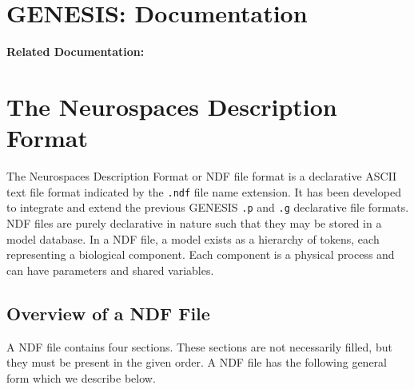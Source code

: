 \documentclass[12pt]{article}
\begin{document}
\section*{GENESIS: Documentation}

{\bf Related Documentation:}

\section*{The Neurospaces Description Format}

The Neurospaces Description Format or NDF file format is a declarative ASCII text file format indicated by the {\tt .ndf} file name extension. It has been developed to integrate and extend the previous GENESIS {\tt .p} and {\tt .g} declarative file formats. NDF files are purely declarative in nature such that they may be stored in a model database. In a NDF file, a model exists as a hierarchy of tokens, each representing a biological component. Each component is a physical process and can have parameters and shared variables. 

\subsection*{Overview of a NDF File}
\label{sec:overview-ndf-file}
A NDF file contains four sections. These sections are not necessarily
filled, but they must be present in the given order.  A NDF file has
the following general form which we describe below.
\end{document}

